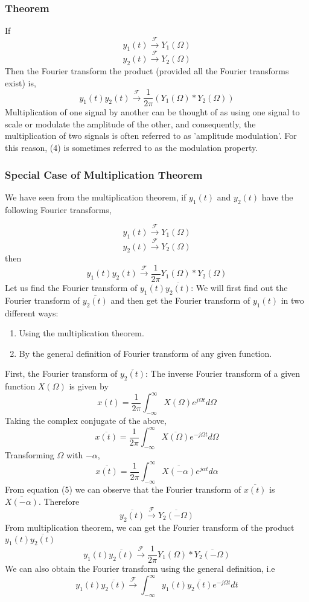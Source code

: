 \subsubsection*{Theorem}
If 
\[
y_1(t)
\xrightarrow{\mathcal{F}} Y_1(\Omega)
\]
\[
y_2(t)
\xrightarrow{\mathcal{F}}
Y_2(\Omega)
\]
Then the Fourier transform the product (provided all the Fourier transforms exist) is,
\begin{equation}
y_1(t)y_2(t) 
\xrightarrow{\mathcal{F}}
\frac{1}{2\pi} 
( Y_1(\Omega) \ast Y_2(\Omega) )
\end{equation}
Multiplication of one signal by another can be thought of as using one signal to scale or modulate the amplitude of the other, and consequently, the multiplication of two signals is often referred to as 'amplitude modulation'. For this reason, (4) is sometimes referred to as the modulation property.


\subsubsection*{Special Case of Multiplication Theorem}
We have seen from the multiplication theorem, if $y_1(t)$ and $y_2(t)$ have the following Fourier transforms, 

\[
y_1(t)
\xrightarrow{\mathcal{F}}
Y_1(\Omega)
\]\[
y_2(t)
\xrightarrow{\mathcal{F}}
Y_2(\Omega)
\]
then
\[
y_1(t) y_2(t) 
\xrightarrow{\mathcal{F}}
\frac{1}{2\pi}
{ Y_1(\Omega) \ast Y_2(\Omega) }
\]
Let us find the Fourier transform of $y_1(t)\overline{y_2(t)}$:
We will first find out the Fourier transform of $\overline{y_2(t)}$ and then get the Fourier transform of $y_1(t)$ in two different ways:\begin{enumerate}
\item Using the multiplication theorem.
\item By the general definition of Fourier transform of any given function.
\end{enumerate}
First, the Fourier transform of  $\overline{y_2(t)}$:
The inverse Fourier transform of a given function $X(\Omega)$ is given by 
\[
x(t) = \frac{1}{2\pi}\int_{-\infty}^{\infty}{ X(\Omega) 
e^{j \Omega t}d\Omega }
\]
Taking the complex conjugate of the above,
\[	
\overline{x(t)} = \frac{1}{2\pi}\int_{-\infty}^{\infty}{\overline{X(\Omega)}e^{-j \Omega t}d\Omega }
\]  
Transforming $\Omega$ with $-\alpha$,
\begin{equation}
\overline{x(t)} = \frac{1}{2\pi}\int_{-\infty}^{\infty}{\overline{X(-\alpha)}e^{j \alpha t}d\alpha }
\end{equation}
From equation (5) we can observe that the Fourier transform of  $\overline{x(t)}$ is $\overline{X(-\alpha)}$.
Therefore 
\[
\overline{y_2(t)}
\xrightarrow{\mathcal{F}}
\overline{Y_2(-\Omega)}
\]
\noindent
From multiplication theorem, we can get the Fourier transform of the product $y_1(t)\overline{y_2(t)}$
\[
y_1(t)\overline{y_2(t)}
\xrightarrow{\mathcal{F}}
\frac{1}{2\pi} { 
Y_1(\Omega) 
\ast 
\overline{Y_2(-\Omega)}}\]
We can also obtain the Fourier transform using the general definition, i.e
\[
y_1(t)\overline{y_2(t)} \xrightarrow{\mathcal{F}}
\int_{-\infty}^{\infty}
{ y_1(t)\overline{y_2(t)} e^{-j\Omega t}dt }
\]

